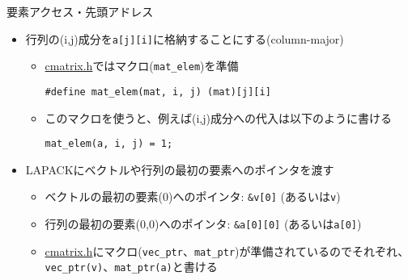 \begin{frame}[t,fragile]{要素アクセス・先頭アドレス}
  \begin{itemize}
  \item 行列の(i,j)成分を\verb+a[j][i]+に格納することにする(column-major)
    \begin{itemize}
      \item \href{https://github.com/todo-group/computer-experiments/blob/master/exercise/matrix/cmatrix.h}{cmatrix.h}ではマクロ(\verb+mat_elem+)を準備
\begin{lstlisting}
#define mat_elem(mat, i, j) (mat)[j][i]
\end{lstlisting}
\item このマクロを使うと、例えば(i,j)成分への代入は以下のように書ける
\begin{lstlisting}
mat_elem(a, i, j) = 1;
\end{lstlisting}
\end{itemize}
  \item LAPACKにベクトルや行列の最初の要素へのポインタを渡す
    \begin{itemize}
      \item ベクトルの最初の要素(0)へのポインタ: \verb+&v[0]+ (あるいは\verb+v+)
      \item 行列の最初の要素(0,0)へのポインタ: \verb+&a[0][0]+ (あるいは\verb+a[0]+)
      \item \href{https://github.com/todo-group/computer-experiments/blob/master/exercise/matrix/cmatrix.h}{cmatrix.h}にマクロ({\tt vec\_ptr}、{\tt mat\_ptr})が準備されているのでそれぞれ、{\tt vec\_ptr(v)}、{\tt mat\_ptr(a)}と書ける
    \end{itemize}
  \end{itemize}
\end{frame}
